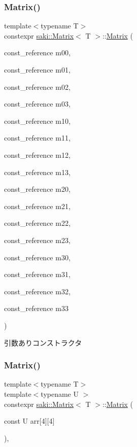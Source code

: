 \subsubsection{\texorpdfstring{Matrix()}{Matrix()}\hspace{0.1cm}{\footnotesize\ttfamily [2/6]}}
{\footnotesize\ttfamily template$<$typename T$>$ \\
constexpr \mbox{\hyperlink{classsaki_1_1_matrix}{saki\+::\+Matrix}}$<$ T $>$\+::\mbox{\hyperlink{classsaki_1_1_matrix}{Matrix}} (\begin{DoxyParamCaption}\item[{const\+\_\+reference}]{m00,  }\item[{const\+\_\+reference}]{m01,  }\item[{const\+\_\+reference}]{m02,  }\item[{const\+\_\+reference}]{m03,  }\item[{const\+\_\+reference}]{m10,  }\item[{const\+\_\+reference}]{m11,  }\item[{const\+\_\+reference}]{m12,  }\item[{const\+\_\+reference}]{m13,  }\item[{const\+\_\+reference}]{m20,  }\item[{const\+\_\+reference}]{m21,  }\item[{const\+\_\+reference}]{m22,  }\item[{const\+\_\+reference}]{m23,  }\item[{const\+\_\+reference}]{m30,  }\item[{const\+\_\+reference}]{m31,  }\item[{const\+\_\+reference}]{m32,  }\item[{const\+\_\+reference}]{m33 }\end{DoxyParamCaption})\hspace{0.3cm}{\ttfamily [inline]}}



引数ありコンストラクタ 

\mbox{\label{classsaki_1_1_matrix_a3d877c3e3581397370561be931972cb9}} 
\subsubsection{\texorpdfstring{Matrix()}{Matrix()}\hspace{0.1cm}{\footnotesize\ttfamily [3/6]}}
{\footnotesize\ttfamily template$<$typename T$>$ \\
template$<$typename U $>$ \\
constexpr \mbox{\hyperlink{classsaki_1_1_matrix}{saki\+::\+Matrix}}$<$ T $>$\+::\mbox{\hyperlink{classsaki_1_1_matrix}{Matrix}} (\begin{DoxyParamCaption}\item[{const U}]{arr\mbox{[}4\mbox{]}\mbox{[}4\mbox{]} }\end{DoxyParamCaption})\hspace{0.3cm}{\ttfamily [inline]}, {\ttfamily [explicit]}}




